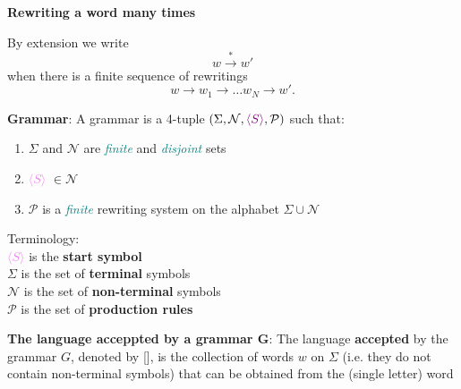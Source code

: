 \documentclass{article}
\newcommand{\defi}[2]{
    \begin{tcolorbox}[
        colback=red!50!yellow!10!white,
        colframe=red!50!yellow
    ]  \textbf{#1}: #2
    \end{tcolorbox}
}
\begin{document}
\vspace{10pt}

\textbf{Rewriting a word many times}

\noindent By extension we write $$w\xrightarrow{*} w'$$ when there is a finite sequence of rewritings $$w\rightarrow w_1 \rightarrow \ldots w_N\rightarrow w'.$$

\defi{Grammar}{A grammar is a 4-tuple $(\Sigma, \mathcal{N}, \textcolor{violet}{\langle S \rangle}, \mathcal{P})$ such that:
\begin{enumerate}
    \item $\Sigma$ and $\mathcal{N}$ are \textcolor{teal}{\textit{finite}} and \textcolor{teal}{\textit{disjoint}} sets
    \item \textcolor{violet}{$\langle S \rangle$} $\in \mathcal{N}$
    \item $\mathcal{P}$ is a \textcolor{teal}{\textit{finite}} rewriting system on the alphabet $\Sigma\cup\mathcal{N}$
\end{enumerate}

Terminology: \\
\textcolor{violet}{$\langle S \rangle$} is the \textbf{start symbol} \\
$\Sigma$ is the set of \textbf{terminal} symbols \\
$\mathcal{N}$ is the set of \textbf{non-terminal} symbols \\
$\mathcal{P}$ is the set of \textbf{production rules}
}

\defi{The language acceppted by a grammar G}{The language \textbf{accepted} by the grammar $G$, denoted by [\![G]\!], is the collection of words $w$ on $\Sigma$ (i.e. they do not contain non-terminal symbols) that can be obtained from the (single letter) word \textcolor{violet}{}}
\end{document}
